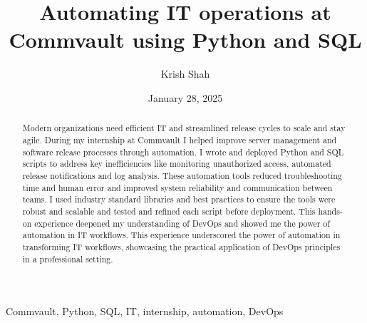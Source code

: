 ﻿\documentclass[12pt,conference,onecolumn]{IEEEtran}
\title{Automating IT operations at Commvault using Python and SQL}
\author{Krish Shah}
\date{January 28, 2025}
\newcommand{\keywords}{Commvault, Python, SQL, IT, internship, automation, DevOps}
\begin{document}
\maketitle 

\begin{abstract}
Modern organizations need efficient IT and streamlined release cycles to scale and stay agile. During my internship at Commvault I helped improve server management and software release processes through automation. I wrote and deployed Python and SQL scripts to address key inefficiencies like monitoring unauthorized access, automated release notifications and log analysis. These automation tools reduced troubleshooting time and human error and improved system reliability and communication between teams. I used industry standard libraries and best practices to ensure the tools were robust and scalable and tested and refined each script before deployment. This hands-on experience deepened my understanding of DevOps and showed me the power of automation in IT workflows. This experience underscored the power of automation in transforming IT workflows, showcasing the practical application of DevOps principles in a professional setting.
\end{abstract}

\begin{IEEEkeywords}
\keywords
\end{IEEEkeywords}
\end{document}
